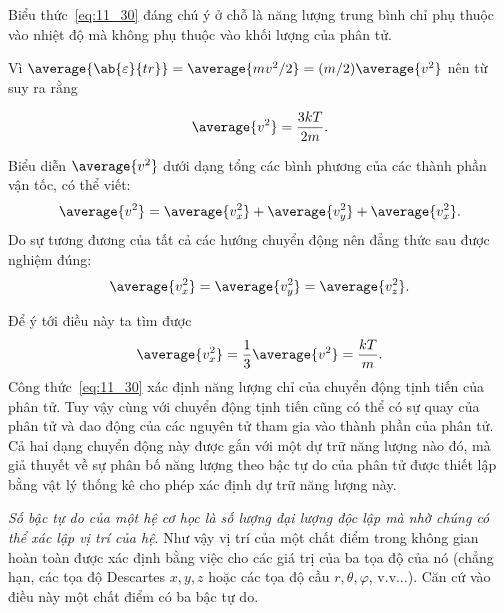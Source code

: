 Biểu thức~\eqref{eq:11_30} đáng chú ý ở chỗ là năng lượng trung bình chỉ phụ thuộc vào nhiệt độ mà không phụ thuộc vào khối lượng của phân tử.

Vì $\average{\ab{\varepsilon}{tr}}=\average{mv^2/2}=(m/2)\average{v^2}$ nên từ  suy ra rằng 


\begin{equation}\label{eq:11_31}
	\average{v^2} = \frac{3kT}{2m}.
\end{equation}

\noindent

Biểu diễn $\average{v^2}$ dưới dạng tổng các bình phương của các thành phần vận tốc, có thể viết:
\begin{equation}
   \average{v^2} = \average{v_x^2} + \average{v_y^2} + \average{v_x^2}.
\end{equation}
Do sự tương đương của tất cả các hướng chuyển động nên đẳng thức sau được nghiệm đúng:
\begin{equation*}
	\average{v_x^2} = \average{v_y^2} = \average{v_z^2}.
\end{equation*}

\noindent
Để ý tới điều này ta tìm được
\begin{equation}\label{eq:11_32}
	\average{v_x^2} = \frac{1}{3}\average{v^2} = \frac{kT}{m}.
\end{equation}
Công thức~\eqref{eq:11_30} xác định năng lượng chỉ của chuyển động tịnh tiến của phân tử. Tuy vậy cùng với chuyển động tịnh tiến cũng có thể có sự quay của phân tử và dao động của các nguyên tử tham gia vào thành phần của phân tử. Cả hai dạng chuyển động này được gắn với một dự trữ năng lượng nào đó, mà giả thuyết về sự phân bố năng lượng theo bậc tự do của phân tử được thiết lập bằng vật lý thống kê cho phép xác định dự trữ năng lượng này.

\textit{Số bậc tự do của một hệ cơ học là số lượng đại lượng độc lập mà nhờ chúng có thể xác lập vị trí của hệ}. Như vậy vị trí của một chất điểm trong không gian hoàn toàn được xác định bằng việc cho các giá trị của ba tọa độ của nó (chẳng hạn, các tọa độ Descartes $x, y, z$ hoặc các tọa độ cầu $r, \theta, \varphi$, v.v$\ldots$). Căn cứ vào điều này một chất điểm có ba bậc tự do.

